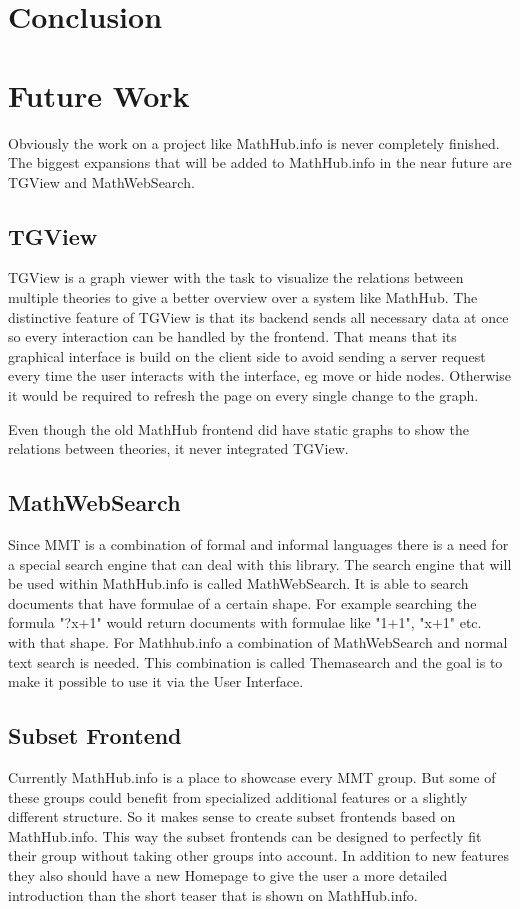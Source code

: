 \documentclass[11pt,a4paper]{article}
\begin{document}
\section{Conclusion} \label{conclusion}
\section{Future Work} \label{future}
Obviously the work on a project like MathHub.info is never completely finished.
The biggest expansions that will be added to MathHub.info in the near future are TGView and MathWebSearch.

\subsection{TGView} 
TGView is a graph viewer with the task to visualize the relations between multiple theories to give a better overview over a system like MathHub.
The distinctive feature of TGView is that its backend sends all necessary data at once so every interaction can be handled by the frontend.
That means that its graphical interface is build on the client side to avoid sending a server request every time the user interacts with the interface, eg move or hide nodes.
Otherwise it would be required to refresh the page on every single change to the graph\cite{tgview}.
 
Even though the old MathHub frontend did have static graphs to show the relations between theories, it never integrated TGView.
 
\subsection{MathWebSearch}
Since MMT is a combination of formal and informal languages there is a need for a special search engine that can deal with this library.
The search engine that will be used within MathHub.info is called MathWebSearch\cite{HamKoh:fsfm15}.
It is able to search documents that have formulae of a certain shape.
For example searching the formula "?x+1" would return documents with formulae like "1+1", "x+1" etc. with that shape.
For Mathhub.info a combination of MathWebSearch and normal text search is needed.
This combination is called Themasearch and the goal is to make it possible to use it via the User Interface.

\subsection{Subset Frontend}
Currently MathHub.info is a place to showcase every MMT group.
But some of these groups could benefit from specialized additional features or a slightly different structure.
So it makes sense to create subset frontends based on MathHub.info.
This way the subset frontends can be designed to perfectly fit their group without taking other groups into account.
In addition to new features they also should have a new Homepage to give the user a more detailed introduction than the short teaser that is shown on MathHub.info.
\end{document}
